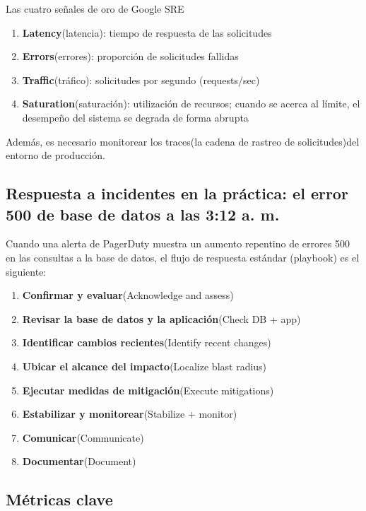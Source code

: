 \documentclass[a4paper]{article}
\begin{document}
\begin{importantbox}{Las cuatro señales de oro de Google SRE}
\begin{enumerate}
    \item \textbf{Latency}(latencia): tiempo de respuesta de las solicitudes
    \item \textbf{Errors}(errores): proporción de solicitudes fallidas
    \item \textbf{Traffic}(tráfico): solicitudes por segundo (requests/sec)
    \item \textbf{Saturation}(saturación): utilización de recursos; cuando se acerca al límite, el desempeño del sistema se degrada de forma abrupta
\end{enumerate}
Además, es necesario monitorear los traces(la cadena de rastreo de solicitudes)del entorno de producción.
\end{importantbox}

\subsection{Respuesta a incidentes en la práctica: el error 500 de base de datos a las 3:12 a. m.}

Cuando una alerta de PagerDuty muestra un aumento repentino de errores 500 en las consultas a la base de datos, el flujo de respuesta estándar (playbook) es el siguiente:

\begin{enumerate}
    \item \textbf{Confirmar y evaluar}(Acknowledge and assess)
    \item \textbf{Revisar la base de datos y la aplicación}(Check DB + app)
    \item \textbf{Identificar cambios recientes}(Identify recent changes)
    \item \textbf{Ubicar el alcance del impacto}(Localize blast radius)
    \item \textbf{Ejecutar medidas de mitigación}(Execute mitigations)
    \item \textbf{Estabilizar y monitorear}(Stabilize + monitor)
    \item \textbf{Comunicar}(Communicate)
    \item \textbf{Documentar}(Document)
\end{enumerate}

\subsection{Métricas clave}
\end{document}

